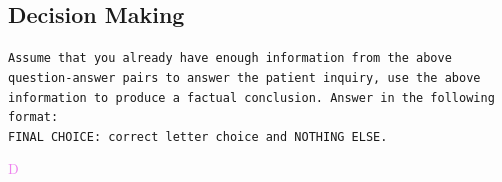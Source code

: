 \subsection{Decision Making}\label{app:expert_decision}
\begin{tcolorbox}[title={\textsc{MediQ} Expert -- Decision Making Module Prompt (appended to previous conversation)}, colframe=gray]
\small\texttt{Assume that you already have enough information from the above question-answer pairs to answer the patient inquiry, use the above information to produce a factual conclusion. Answer in the following format:\vspace{4mm}\\
FINAL CHOICE: correct letter choice and NOTHING ELSE.}\normalsize
\end{tcolorbox}

\begin{tcolorbox}[title={Example LLM Output}, colframe=gray]
\small\textcolor{violet}{D}\normalsize
\end{tcolorbox}









